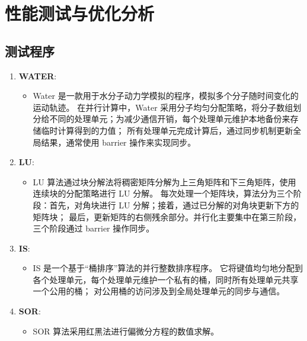 \chapter{性能测试与优化分析}\label{chap:experiments}{
    \section{测试程序}\label{sec:测试程序}


    \begin{enumerate}[leftmargin=1em, align=left]
        \item \textbf{WATER}:
              \begin{itemize}[leftmargin=*, nosep]
                  \item Water 是一款用于水分子动力学模拟的程序，模拟多个分子随时间变化的运动轨迹。
                        在并行计算中，Water 采用分子均匀分配策略，将分子数组划分给不同的处理单元；为减少通信开销，每个处理单元维护本地备份来存储临时计算得到的力值；
                        所有处理单元完成计算后，通过同步机制更新全局结果，通常使用 barrier 操作来实现同步。
              \end{itemize}
        \item \textbf{LU}:
              \begin{itemize}[leftmargin=*, nosep]
                  \item LU 算法通过块分解法将稠密矩阵分解为上三角矩阵和下三角矩阵，使用连续块的分配策略进行 LU 分解。
                        每次处理一个矩阵块，算法分为三个阶段：首先，对角块进行 LU 分解；接着，通过已分解的对角块更新下方的矩阵块；
                        最后，更新矩阵的右侧残余部分。并行化主要集中在第三阶段，三个阶段通过 barrier 操作同步。
              \end{itemize}
        \item \textbf{IS}:
              \begin{itemize}[leftmargin=*, nosep]
                  \item IS 是一个基于“桶排序”算法的并行整数排序程序。
                        它将键值均匀地分配到各个处理单元，每个处理单元维护一个私有的桶，同时所有处理单元共享一个公用的桶；
                        对公用桶的访问涉及到全局处理单元的同步与通信。
              \end{itemize}
        \item \textbf{SOR}:
              \begin{itemize}[leftmargin=*, nosep]
                  \item SOR 算法采用红黑法进行偏微分方程的数值求解。

\end{itemize}
\end{enumerate}}
